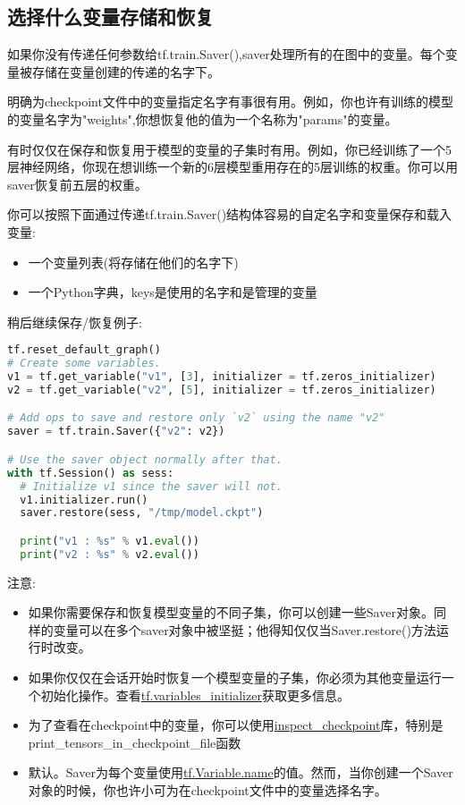 \subsection{选择什么变量存储和恢复}
如果你没有传递任何参数给tf.train.Saver(),saver处理所有的在图中的变量。每个变量被存储在变量创建的传递的名字下。

明确为checkpoint文件中的变量指定名字有事很有用。例如，你也许有训练的模型的变量名字为"weights",你想恢复他的值为一个名称为"params"的变量。

有时仅仅在保存和恢复用于模型的变量的子集时有用。例如，你已经训练了一个5层神经网络，你现在想训练一个新的6层模型重用存在的5层训练的权重。你可以用saver恢复前五层的权重。

你可以按照下面通过传递tf.train.Saver()结构体容易的自定名字和变量保存和载入变量:
\begin{itemize}
\item 一个变量列表(将存储在他们的名字下)
\item 一个Python字典，keys是使用的名字和是管理的变量
\end{itemize}
稍后继续保存/恢复例子:
\begin{lstlisting}[language=Python]
tf.reset_default_graph()
# Create some variables.
v1 = tf.get_variable("v1", [3], initializer = tf.zeros_initializer)
v2 = tf.get_variable("v2", [5], initializer = tf.zeros_initializer)

# Add ops to save and restore only `v2` using the name "v2"
saver = tf.train.Saver({"v2": v2})

# Use the saver object normally after that.
with tf.Session() as sess:
  # Initialize v1 since the saver will not.
  v1.initializer.run()
  saver.restore(sess, "/tmp/model.ckpt")

  print("v1 : %s" % v1.eval())
  print("v2 : %s" % v2.eval())
\end{lstlisting}
注意:
\begin{itemize}
\item 如果你需要保存和恢复模型变量的不同子集，你可以创建一些Saver对象。同样的变量可以在多个saver对象中被坚挺；他得知仅仅当Saver.restore()方法运行时改变。
\item 如果你仅仅在会话开始时恢复一个模型变量的子集，你必须为其他变量运行一个初始化操作。查看\href{https://www.tensorflow.org/api_docs/python/tf/variables_initializer?hl=zh-cn}{tf.variables\_initializer}获取更多信息。
\item 为了查看在checkpoint中的变量，你可以使用\href{https://www.github.com/tensorflow/tensorflow/blob/r1.4/tensorflow/python/tools/inspect_checkpoint.py}{inspect\_checkpoint}库，特别是print\_tensors\_in\_checkpoint\_file函数
\item 默认。Saver为每个变量使用\href{https://www.tensorflow.org/api_docs/python/tf/Variable?hl=zh-cn#name}{tf.Variable.name}的值。然而，当你创建一个Saver对象的时候，你也许小可为在checkpoint文件中的变量选择名字。
\end{itemize}
